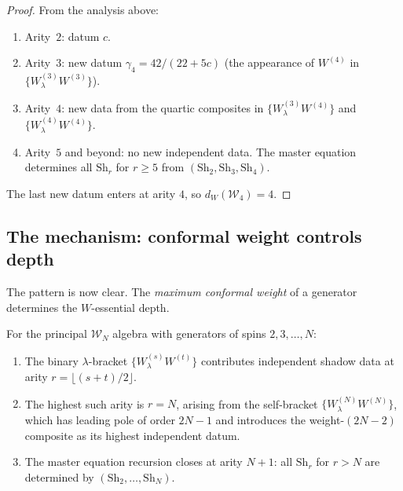 \documentclass[11pt]{article}
\newcommand{\cW}{\mathcal{W}}
\begin{document}
\begin{proof}
From the analysis above:
\begin{enumerate}[label=\textup{(\roman*)},nosep]
\item Arity~$2$: datum $c$.
\item Arity~$3$: new datum $\gamma_4 = 42/(22{+}5c)$ (the
  appearance of $W^{(4)}$ in $\{W^{(3)}_\lambda W^{(3)}\}$).
\item Arity~$4$: new data from the quartic composites in
  $\{W^{(3)}_\lambda W^{(4)}\}$ and
  $\{W^{(4)}_\lambda W^{(4)}\}$.
\item Arity~$5$ and beyond: no new independent data.  The
  master equation determines all $\mathrm{Sh}_r$ for $r \ge 5$
  from $(\mathrm{Sh}_2, \mathrm{Sh}_3, \mathrm{Sh}_4)$.
\end{enumerate}
The last new datum enters at arity $4$, so $d_W(\cW_4) = 4$.
\end{proof}

\subsection*{The mechanism: conformal weight controls depth}

The pattern is now clear.  The \emph{maximum conformal weight}
of a generator determines the $W$-essential depth.

\begin{proposition}[Depth = maximum spin]
\label{prop:depth-equals-spin}
For the principal $\cW_N$ algebra with generators of spins
$2, 3, \ldots, N$:
\begin{enumerate}[label=\textup{(\roman*)}]
\item The binary $\lambda$-bracket $\{W^{(s)}_\lambda W^{(t)}\}$
  contributes independent shadow data at arity
  $r = \lfloor(s + t)/2\rfloor$.
\item The highest such arity is $r = N$, arising from the
  self-bracket $\{W^{(N)}_\lambda W^{(N)}\}$, which has
  leading pole of order $2N - 1$ and introduces the weight-$(2N-2)$
  composite as its highest independent datum.
\item The master equation recursion closes at arity $N + 1$:
  all $\mathrm{Sh}_r$ for $r > N$ are determined by
  $(\mathrm{Sh}_2, \ldots, \mathrm{Sh}_N)$.
\end{enumerate}
\end{proposition}
\end{document}
